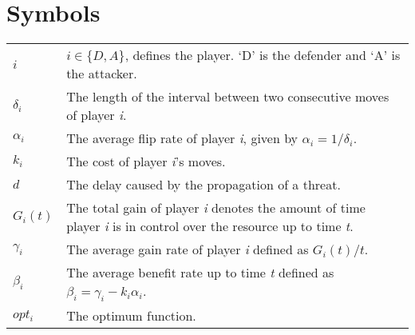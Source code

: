 \documentclass[master=cws, masteroption=vs]{kulemt}
\begin{document}
\section*{Symbols}
\begin{flushleft}
  \renewcommand{\arraystretch}{1.1}
  \begin{tabularx}{\textwidth}{@{}p{12mm}X@{}}
 $i$ & $i \in \{D,A\}$, defines the player. `D' is the defender and `A' is the attacker. \\
 $\delta_{i}$ & The length of the interval between two consecutive moves of player \textit{i}. \\
 $\alpha_{i}$ & The average flip rate of player \textit{i}, given by $\alpha_{i}=1/\delta_{i}$. \\
$k_{i}$ & The cost of player \textit{i}'s moves. \\
$d$ & The delay caused by the propagation of a threat. \\
 $G_{i}(t)$ & The total gain of player \textit{i} denotes the amount of time player \textit{i} is in control over the resource up to time \textit{t}. \\
$\gamma_{i}$ & The average gain rate of player \textit{i} defined as $G_{i}(t)/t$. \\
$\beta_{i}$ &  The average benefit rate up to time \textit{t} defined as  $\beta_{i} = \gamma_{i} -k_{i} \alpha_{i} $. \\
$opt_{i}$ & The optimum function. \\
  \end{tabularx}
\end{flushleft}

\mainmatter

%


%








%
%
%
%
%


%
%

\backmatter


\end{document}
